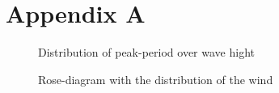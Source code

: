 \chapter{Appendix A}

 
\begin{figure}[H]
\center
{}
\caption[Distribution of peak-period over wave hight]{Distribution of peak-period over wave hight}
\end{figure}
% 
% 
\begin{figure}[H]
\center
{}
\caption{Rose-diagram with the distribution of the wind}
\end{figure}
% 
% 
